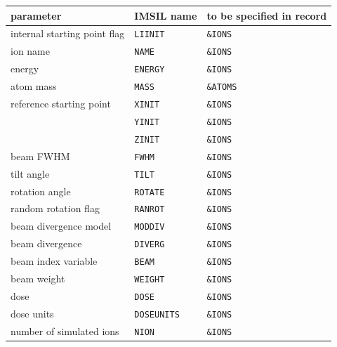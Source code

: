 \begin{center}
\begin{tabular}{lll}
parameter \quad              & IMSIL name      & to be specified in record \\
\hline
internal starting point flag & \texttt{LIINIT}    & \texttt{\&IONS} \\
ion name                     & \texttt{NAME}      & \texttt{\&IONS} \\
energy                       & \texttt{ENERGY}    & \texttt{\&IONS} \\
atom mass                    & \texttt{MASS}      & \texttt{\&ATOMS} \\
reference starting point     & \texttt{XINIT}     & \texttt{\&IONS} \\
                             & \texttt{YINIT}     & \texttt{\&IONS} \\
                             & \texttt{ZINIT}     & \texttt{\&IONS} \\
beam FWHM                    & \texttt{FWHM}      & \texttt{\&IONS} \\
tilt angle                   & \texttt{TILT}      & \texttt{\&IONS} \\
rotation angle               & \texttt{ROTATE}    & \texttt{\&IONS} \\
random rotation flag         & \texttt{RANROT}    & \texttt{\&IONS} \\
beam divergence model        & \texttt{MODDIV}    & \texttt{\&IONS} \\
beam divergence              & \texttt{DIVERG}    & \texttt{\&IONS} \\
beam index variable          & \texttt{BEAM}      & \texttt{\&IONS} \\
beam weight                  & \texttt{WEIGHT}    & \texttt{\&IONS} \\
dose                         & \texttt{DOSE}      & \texttt{\&IONS} \\
dose units                   & \texttt{DOSEUNITS} & \texttt{\&IONS} \\
number of simulated ions     & \texttt{NION}      & \texttt{\&IONS} \\
\end{tabular}
\end{center}
